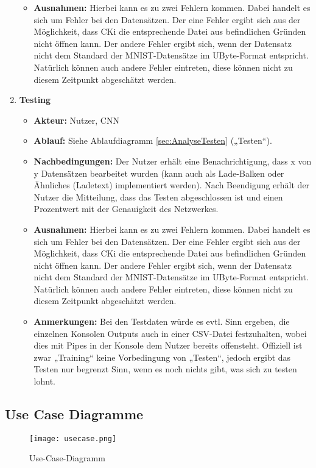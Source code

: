 \begin{enumerate}
\begin{itemize}
		\item \textbf{Ausnahmen:} Hierbei kann es zu zwei Fehlern kommen. Dabei handelt es sich um Fehler bei den Datensätzen. Der eine Fehler ergibt sich aus der Möglichkeit, dass CKi die entsprechende Datei aus befindlichen Gründen nicht öffnen kann.
Der andere Fehler ergibt sich, wenn der Datensatz nicht dem Standard der MNIST-Datensätze im UByte-Format entspricht.
\\
Natürlich können auch andere Fehler eintreten, diese können nicht zu diesem Zeitpunkt abgeschätzt werden.
	\end{itemize}
	\item \textbf{Testing}
	\begin{itemize}
		\item \textbf{Akteur:} Nutzer, CNN
		\item \textbf{Ablauf:} Siehe Ablaufdiagramm \ref{sec:AnalyseTesten} („Testen“).
		\item \textbf{Nachbedingungen:} Der Nutzer erhält eine Benachrichtigung, dass x von y Datensätzen bearbeitet wurden (kann auch als Lade-Balken oder Ähnliches (Ladetext) implementiert werden). Nach Beendigung erhält der Nutzer die Mitteilung, dass das Testen abgeschlossen ist und einen Prozentwert mit der Genauigkeit des Netzwerkes.
		\item \textbf{Ausnahmen:} Hierbei kann es zu zwei Fehlern kommen. Dabei handelt es sich um Fehler bei den Datensätzen. Der eine Fehler ergibt sich aus der Möglichkeit, dass CKi die entsprechende Datei aus befindlichen Gründen nicht öffnen kann.
Der andere Fehler ergibt sich, wenn der Datensatz nicht dem Standard der MNIST-Datensätze im UByte-Format entspricht.
Natürlich können auch andere Fehler eintreten, diese können nicht zu diesem Zeitpunkt abgeschätzt werden.
		\item \textbf{Anmerkungen:} Bei den Testdaten würde es evtl. Sinn ergeben, die einzelnen Konsolen Outputs auch in einer CSV-Datei festzuhalten, wobei dies mit Pipes in der Konsole dem Nutzer bereits offensteht. Offiziell ist zwar „Training“ keine Vorbedingung von „Testen“, jedoch ergibt das Testen nur begrenzt Sinn, wenn es noch nichts gibt, was sich zu testen lohnt.
	\end{itemize}
\end{enumerate}

\subsection{Use Case Diagramme}
\label{sec:AnalyseUseCaseDiagramme}
\begin{figure}[H]
	\centering
	\texttt{[image: usecase.png]}
	\caption{Use-Case-Diagramm}
	\label{fig:analyseusecase}
\end{figure}

